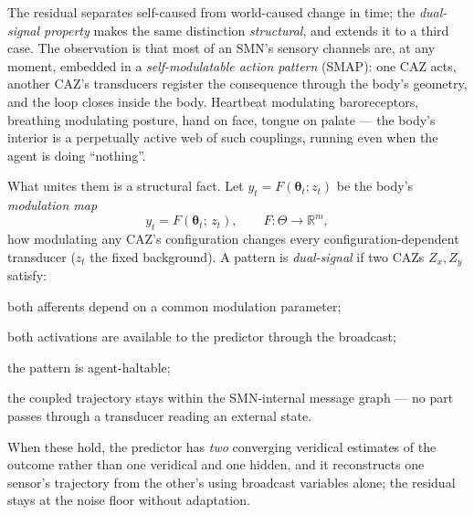 \documentclass{article}
\begin{document}
The residual separates self-caused from world-caused change in time; the
\emph{dual-signal property} makes the same distinction \emph{structural},
and extends it to a third case.  The observation is that most of an SMN's
sensory channels are, at any moment, embedded in a \emph{self-modulatable
action pattern} (SMAP): one CAZ acts, another CAZ's transducers register
the consequence through the body's geometry, and the loop closes inside
the body.  Heartbeat modulating baroreceptors, breathing modulating
posture, hand on face, tongue on palate --- the body's interior is a
perpetually active web of such couplings, running even when the agent is
doing ``nothing''.

What unites them is a structural fact.  Let $y_t = F(\boldsymbol\theta_t;
z_t)$ be the body's \emph{modulation map}
\begin{equation}
y_t = F(\boldsymbol\theta_t;\,z_t),\qquad F:\Theta\to\mathbb{R}^m,
\label{eq:F-modulation}
\end{equation}
how modulating any CAZ's configuration changes every
configuration-dependent transducer ($z_t$ the fixed background).  A
pattern is \emph{dual-signal} if two CAZs $Z_x,Z_y$ satisfy:
\begin{description}[itemsep=2pt,labelindent=0pt,leftmargin=4em,style=nextline]
\item[(DS-1) Shared sensitivity] both afferents depend on a common
modulation parameter;
\item[(DS-2) Both efference copies in broadcast] both activations are
available to the predictor through the broadcast;
\item[(DS-3) Haltability] the pattern is agent-haltable;
\item[(DS-4) Trajectory closure] the coupled trajectory stays within the
SMN-internal message graph --- no part passes through a transducer
reading an external state.
\end{description}
When these hold, the predictor has \emph{two} converging veridical
estimates of the outcome rather than one veridical and one hidden, and it
reconstructs one sensor's trajectory from the other's using broadcast
variables alone; the residual stays at the noise floor without
adaptation.
\end{document}
